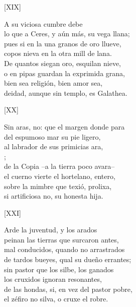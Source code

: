 \documentclass[11pt,a4paper,twoside]{article}
\begin{document}
\begin{center}
	[XIX]
\end{center}\pstart
A  su viciosa cumbre debe\\
lo que a Ceres, y aún más, su vega llana;\\
pues si en la una granos de oro llueve,\\
copos nieva en la otra mill de lana.\\
De quantos siegan oro, esquilan nieve,\\
o en pipas guardan la exprimida grana,\\
bien sea religión, bien amor sea,\\
deidad, aunque sin templo, es Galathea.\par\pend
%
\begin{center}
	[XX]
\end{center}\pstart
Sin aras, no: que el margen donde para\\
del espumoso mar su pie ligero,\\
al labrador de sus primicias ara,\\
;\\
de la Copia --a la tierra poco avara--\\
el cuerno vierte el hortelano, entero,\\
sobre la mimbre que texió, prolixa,\\
si artificiosa no, su honesta hija.\par\pend
%
\begin{center}
	[XXI]
\end{center}\pstart
Arde la juventud, y los arados\\
peinan las tierras que surcaron antes,\\
mal conducidos, quando no arrastrados\\
de tardos bueyes, qual su dueño errantes;\\
sin pastor que los silbe, los ganados\\
los cruxidos ignoran resonantes,\\
de las hondas, si, en vez del pastor pobre,\\
el zéfiro no silva, o cruxe el robre.\par\pend
\end{document}
